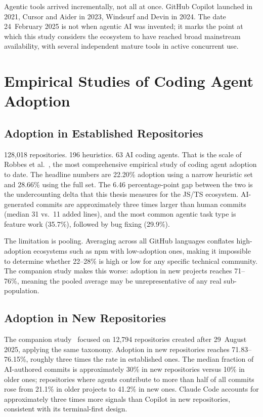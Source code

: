 Agentic tools arrived incrementally, not all at once. GitHub Copilot launched in 2021, Cursor and Aider in 2023, Windsurf and Devin in 2024. The date 24~February 2025 is not when agentic AI was invented; it marks the point at which this study considers the ecosystem to have reached broad mainstream availability, with several independent mature tools in active concurrent use.

\section{Empirical Studies of Coding Agent Adoption}
\label{sec:lr:adoption}

\subsection{Adoption in Established Repositories}

128,018 repositories. 196 heuristics. 63 AI coding agents. That is the scale of Robbes et al.~\cite{robbesAgenticMuch2026}, the most comprehensive empirical study of coding agent adoption to date. The headline numbers are 22.20\% adoption using a narrow heuristic set and 28.66\% using the full set. The 6.46 percentage-point gap between the two is the undercounting delta that this thesis measures for the JS/TS ecosystem. AI-generated commits are approximately three times larger than human commits (median 31 vs.\ 11 added lines), and the most common agentic task type is feature work (35.7\%), followed by bug fixing (29.9\%).

The limitation is pooling. Averaging across all GitHub languages conflates high-adoption ecosystems such as npm with low-adoption ones, making it impossible to determine whether 22--28\% is high or low for any specific technical community. The companion study makes this worse: adoption in new projects reaches 71--76\%, meaning the pooled average may be unrepresentative of any real sub-population.

\subsection{Adoption in New Repositories}

The companion study~\cite{robbesAgenticVery2026} focused on 12,794 repositories created after 29~August 2025, applying the same taxonomy. Adoption in new repositories reaches 71.83--76.15\%, roughly three times the rate in established ones. The median fraction of AI-authored commits is approximately 30\% in new repositories versus 10\% in older ones; repositories where agents contribute to more than half of all commits rose from 21.1\% in older projects to 41.2\% in new ones. Claude Code accounts for approximately three times more signals than Copilot in new repositories, consistent with its terminal-first design.

